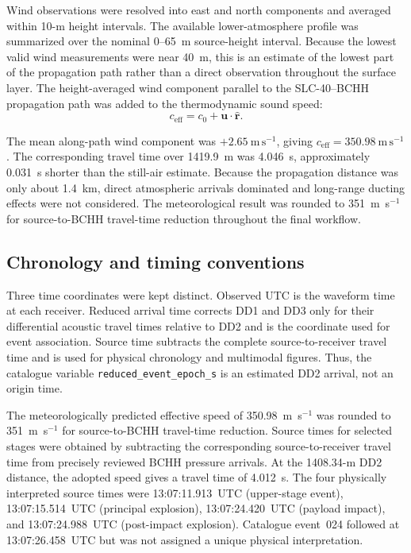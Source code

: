 \documentclass[]{seismica}
\begin{document}
Wind observations were resolved into east and north components and averaged
within 10-m height intervals. The available lower-atmosphere profile was
summarized over the nominal 0--65~m source-height interval. Because the lowest
valid wind measurements were near 40~m, this is an estimate of the lowest part
of the propagation path rather than a direct observation throughout the
surface layer. The height-averaged wind component parallel to the
SLC-40--BCHH propagation path was added to the thermodynamic sound speed:
\begin{equation}
  c_{\mathrm{eff}} =
  c_0 + \mathbf{u}\cdot\hat{\mathbf{r}}.
  \label{eq:effective_speed}
\end{equation}

The mean along-path wind component was $+2.65~\mathrm{m\,s^{-1}}$, giving
$c_{\mathrm{eff}}=350.98~\mathrm{m\,s^{-1}}$. The corresponding travel time
over 1419.9~m was 4.046~s, approximately 0.031~s shorter than the still-air
estimate. Because the propagation distance was only about 1.4~km, direct
atmospheric arrivals dominated and long-range ducting effects were not
considered. The meteorological result was rounded to 351~m~s$^{-1}$ for
source-to-BCHH travel-time reduction throughout the final workflow.

\subsection{Chronology and timing conventions}
\label{sec:methods_chronology}

Three time coordinates were kept distinct. Observed UTC is the waveform time at
each receiver. Reduced arrival time corrects DD1 and DD3 only for their
differential acoustic travel times relative to DD2 and is the coordinate used
for event association. Source time subtracts the complete source-to-receiver
travel time and is used for physical chronology and multimodal figures. Thus,
the catalogue variable \texttt{reduced\_event\_epoch\_s} is an estimated DD2
arrival, not an origin time.

The meteorologically predicted effective speed of 350.98~m~s$^{-1}$ was
rounded to 351~m~s$^{-1}$ for source-to-BCHH travel-time reduction. Source
times for selected stages were obtained by subtracting the corresponding
source-to-receiver travel time from precisely reviewed BCHH pressure arrivals.
At the 1408.34-m DD2 distance, the adopted speed gives a travel time of
4.012~s. The four physically interpreted source times were
13:07:11.913~UTC (upper-stage event), 13:07:15.514~UTC (principal explosion),
13:07:24.420~UTC (payload impact), and 13:07:24.988~UTC (post-impact explosion).
Catalogue event~024 followed at 13:07:26.458~UTC but was not assigned a unique
physical interpretation.
\end{document}
